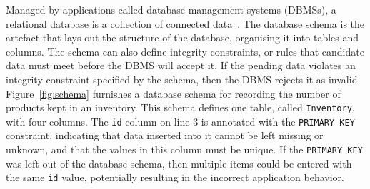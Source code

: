 



Managed by applications called database management systems (DBMSs), a relational database is a collection of connected
data~\cite{databasebook}. The database schema is the artefact that lays out the structure of the database, organising it
into tables and columns.  The schema can also define integrity constraints, or rules that candidate data must meet
before the DBMS will accept it. If the pending data violates an integrity constraint specified by the schema, then the
DBMS rejects it as invalid.  Figure~\ref{fig:schema} furnishes a database schema for recording the number of products
kept in an inventory. This schema defines one table, called \texttt{Inventory}, with four columns.  The \texttt{id}
column on line $3$ is annotated with the \texttt{PRIMARY KEY} constraint, indicating that data inserted into it cannot
be left missing or unknown, and that the values in this column must be unique. If the \texttt{PRIMARY KEY} was left out
of the database schema, then multiple items could be entered with the same \texttt{id} value, potentially resulting in
the incorrect application behavior.

